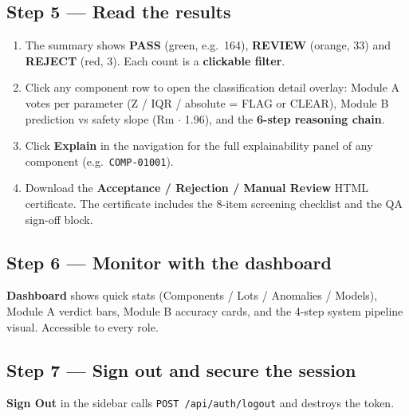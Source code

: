 \documentclass[11pt,a4paper]{article}
\newcommand{\code}[1]{\texttt{\small #1}}
\newcommand{\keys}[1]{\textbf{\sffamily#1}}
\begin{document}
\subsection*{Step 5 --- Read the results}
\begin{enumerate}[leftmargin=1.5em]
  \item The summary shows \keys{PASS} (green, e.g.\ 164), \keys{REVIEW} (orange, 33) and
        \keys{REJECT} (red, 3). Each count is a \textbf{clickable filter}.
  \item Click any component row to open the classification detail overlay:
    Module A votes per parameter (Z / IQR / absolute = FLAG or CLEAR), Module B prediction vs
    safety slope (Rm $\cdot$ 1.96), and the \textbf{6-step reasoning chain}.
  \item Click \keys{Explain} in the navigation for the full explainability panel of any
        component (e.g.\ \code{COMP-01001}).
  \item Download the \keys{Acceptance / Rejection / Manual Review} HTML certificate. The
        certificate includes the 8-item screening checklist and the QA sign-off block.
\end{enumerate}

\subsection*{Step 6 --- Monitor with the dashboard}
\keys{Dashboard} shows quick stats (Components / Lots / Anomalies / Models), Module A verdict
bars, Module B accuracy cards, and the 4-step system pipeline visual. Accessible to every role.

\subsection*{Step 7 --- Sign out and secure the session}
\keys{Sign Out} in the sidebar calls \code{POST /api/auth/logout} and destroys the token.
\end{document}
